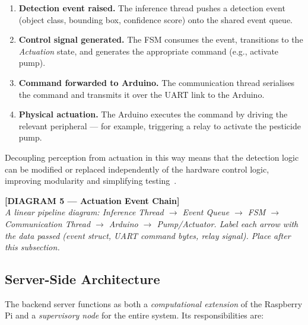 \begin{enumerate}
    \item \textbf{Detection event raised.} The inference thread pushes
          a detection event (object class, bounding box, confidence
          score) onto the shared event queue.
 
    \item \textbf{Control signal generated.} The FSM consumes the
          event, transitions to the \emph{Actuation} state, and
          generates the appropriate command (e.g., activate pump).
 
    \item \textbf{Command forwarded to Arduino.} The communication
          thread serialises the command and transmits it over the
          UART link to the Arduino.
 
    \item \textbf{Physical actuation.} The Arduino executes the
          command by driving the relevant peripheral — for example,
          triggering a relay to activate the pesticide pump.
\end{enumerate}
 
Decoupling perception from actuation in this way means that the
detection logic can be modified or replaced independently of the
hardware control logic, improving modularity and simplifying
testing~\cite{brooks1991intelligence}.
 
\bigskip
\noindent\textbf{[DIAGRAM 5 — Actuation Event Chain]}\\
\textit{A linear pipeline diagram: Inference Thread
$\rightarrow$ Event Queue $\rightarrow$ FSM $\rightarrow$
Communication Thread $\rightarrow$ Arduino $\rightarrow$ Pump/Actuator.
Label each arrow with the data passed (event struct, UART command
bytes, relay signal). Place after this subsection.}
\bigskip
 
\subsection{Server-Side Architecture}
 
The backend server functions as both a \emph{computational extension}
of the Raspberry Pi and a \emph{supervisory node} for the entire
system. Its responsibilities are:
 
